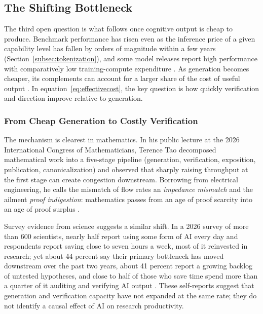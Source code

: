 \documentclass[12pt]{article}
\theoremstyle{plain}
\theoremstyle{definition}
\theoremstyle{remark}
\begin{document}
\subsection{The Shifting Bottleneck}\label{subsec:scarcity}

The third open question is what follows once cognitive output is cheap
to produce. Benchmark performance has risen even as the inference price
of a given capability level has fallen by orders of magnitude within a
few years (Section~\ref{subsec:tokenization}), and some model releases
report high performance with comparatively low training-compute
expenditure \citep[e.g.,][]{DeepSeekR1_2025}. As generation becomes
cheaper, its complements can account for a larger share of the cost of
useful output \citep{AgrawalGansGoldfarb2022}. In
equation~\eqref{eq:effectivecost}, the key question is how quickly
verification and direction improve relative to generation.

\subsubsection{From Cheap Generation to Costly Verification}

The mechanism is clearest in mathematics. In his public lecture at the 2026
International Congress of Mathematicians, Terence Tao decomposed mathematical
work into a five-stage pipeline (generation, verification, exposition,
publication, canonicalization) and observed that sharply raising throughput
at the first stage can create congestion downstream. Borrowing from electrical
engineering, he calls the mismatch of flow rates an \emph{impedance
mismatch} and the ailment \emph{proof indigestion}: mathematics passes from
an age of proof scarcity into an age of proof surplus \citep{Tao2026ICM}.

Survey evidence from science suggests a similar shift. In a
2026 survey of more than 600 scientists, nearly half report using some
form of AI every day and respondents report saving close to seven hours
a week, most of it reinvested in research; yet about 44 percent say
their primary bottleneck has moved downstream over the past two years,
about 41 percent report a growing backlog of untested hypotheses, and
close to half of those who save time spend more than a quarter of it
auditing and verifying AI output \citep{CodreanuEtAl2026AIScience}.
These self-reports suggest that generation and verification capacity
have not expanded at the same rate; they do not identify a causal
effect of AI on research productivity.
\end{document}
